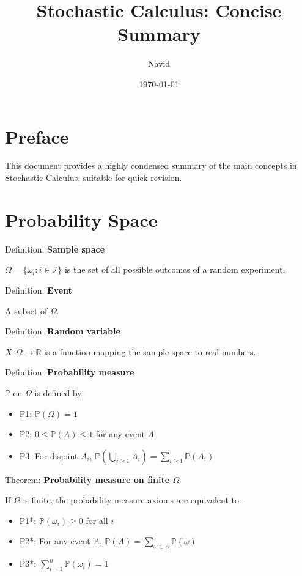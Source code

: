 \documentclass[12pt,a4paper]{article}
\title{Stochastic Calculus: Concise Summary}
\author{Navid}
\date{\today}
\begin{document}
\setlength{\parindent}{0pt}

\maketitle
\tableofcontents

\section*{Preface}
This document provides a highly condensed summary of the main concepts in Stochastic Calculus, suitable for quick revision.

\section{Probability Space}



Definition: \textbf{Sample space}

$\Omega = \{\omega_i : i \in \mathcal{I}\}$ is the set of all possible outcomes of a random experiment.


Definition: \textbf{Event}

A subset of $\Omega$.


Definition: \textbf{Random variable}

$X : \Omega \to \mathbb{R}$ is a function mapping the sample space to real numbers.


Definition: \textbf{Probability measure}

$\mathbb{P}$ on $\Omega$ is defined by:
\begin{itemize}
	\item P1: $\mathbb{P}(\Omega) = 1$
	\item P2: $0 \leq \mathbb{P}(A) \leq 1$ for any event $A$
	\item P3: For disjoint $A_i$, $\mathbb{P}\left(\bigcup_{i \geq 1} A_i\right) = \sum_{i \geq 1} \mathbb{P}(A_i)$
\end{itemize}

Theorem: \textbf{Probability measure on finite $\Omega$}

If $\Omega $ is finite, the probability measure axioms are equivalent to:
\begin{itemize}
	\item P1*: $\mathbb{P}(\omega_i) \geq 0$ for all $i$
	\item P2*: For any event $A$, $\mathbb{P}(A) = \sum_{\omega \in A} \mathbb{P}(\omega)$
	\item P3*: $\sum_{i=1}^n \mathbb{P}(\omega_i) = 1$
\end{itemize}
\end{document}
